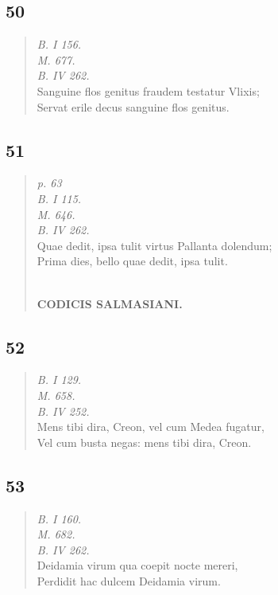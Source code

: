 \documentclass[11pt, a4paper]{report}
\begin{document}
            \subsection*{50}
      \begin{verse}
      \textit{B. I 156.} \\ \textit{M. 677.} \\ \textit{B. IV 262.} \\ Sanguine flos genitus fraudem testatur Vlixis; \\ Servat erile decus sanguine flos genitus. \\ 
      \end{verse}
  
            \subsection*{51}
      \begin{verse}
      \textit{p. 63} \\ \textit{B. I 115.} \\ \textit{M. 646.} \\ \textit{B. IV 262.} \\ Quae dedit, ipsa tulit virtus Pallanta dolendum; \\ Prima dies, bello quae dedit, ipsa tulit. \\ 
        ﻿\pagebreak 
    \begin{center} \textbf{CODICIS SALMASIANI.} \end{center} \marginpar{[105]} 
      \end{verse}
  
            \subsection*{52}
      \begin{verse}
      \textit{B. I 129.} \\ \textit{M. 658.} \\ \textit{B. IV 252.} \\ Mens tibi dira, Creon, vel cum Medea fugatur, \\ Vel cum busta negas: mens tibi dira, Creon. \\ 
      \end{verse}
  
            \subsection*{53}
      \begin{verse}
      \textit{B. I 160.} \\ \textit{M. 682.} \\ \textit{B. IV 262.} \\ Deidamia virum qua coepit nocte mereri, \\ Perdidit hac dulcem Deidamia virum. \\ 
      \end{verse}
  
\end{document}
